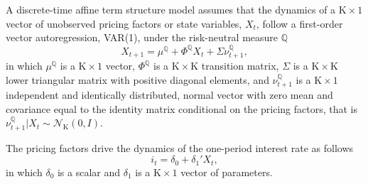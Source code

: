 \documentclass[a4paper, 12pt]{article}
\providecommand{\idxt}{t}
\providecommand{\srate}{i}
\providecommand{\shortrate}{\srate_{\idxt}}
\providecommand{\Xvars}{X_{\idxt}}
\providecommand{\XvarsFwd}{X_{\idxt+1}}
\providecommand{\Xdim}{\mathrm{K}}
\providecommand{\Normal}{\mathcal{N}}
\providecommand{\Qmeasure}{\mathbb{Q}}
\providecommand{\deltazero}{\delta_{0}}
\providecommand{\deltaone}{\delta_{1}}
\providecommand{\error}{\nu_{t+1}}
\providecommand{\errorQ}{\error^{\Qmeasure}}
\providecommand{\XmuQ}{\mu^{\Qmeasure}}
\providecommand{\XSigma}{\Sigma}
\providecommand{\XPhiQ}{\Phi^{\Qmeasure}}
\newcommand{\eqXvarsFwdQ}{\XvarsFwd = \XmuQ + \XPhiQ \Xvars  + \XSigma \errorQ}
\newcommand{\eqshortrate}{\shortrate = \deltazero + \deltaone' \Xvars}
\begin{document}
A discrete-time affine term structure model assumes that the dynamics of a \(\Xdim \times 1\) vector of unobserved pricing factors or state variables, \(\Xvars\), follow a first-order vector autoregression, VAR(1), under the risk-neutral measure \(\Qmeasure\)
\begin{equation} \label{eq:nXvarsQ}
\eqXvarsFwdQ ,
\end{equation}
\noindent in which \(\XmuQ\) is a \(\Xdim \times 1\) vector, \(\XPhiQ\) is a \(\Xdim \times \Xdim\) transition matrix, \(\XSigma\) is a \(\Xdim \times \Xdim\) lower triangular matrix with positive diagonal elements, and \(\errorQ\) is a \(\Xdim \times 1\) independent and identically distributed, normal vector with zero mean and covariance equal to the identity matrix conditional on the pricing factors, that is \(\error^{\Qmeasure} | \Xvars \sim \Normal_{\Xdim} \left(0,I\right)\). 

The pricing factors drive the dynamics of the one-period interest rate as follows 
\begin{equation} \label{eq:nShortRate}
\eqshortrate ,
\end{equation}
\noindent in which \(\deltazero\) is a scalar and \(\deltaone\) is a \(\Xdim \times 1\) vector of parameters.
\end{document}
